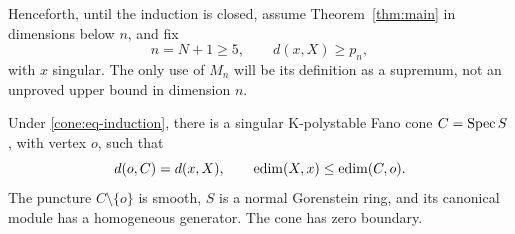 Henceforth, until the induction is closed, assume
Theorem~\ref{thm:main} in dimensions below \(n\), and fix
\begin{equation}\label{cone:eq-induction}
 n=N+1\ge5,\qquad
 d(x,X)\ge p_n,
\end{equation}
with \(x\) singular. The only use of \(M_n\) will be its definition
as a supremum, not an unproved upper bound in dimension \(n\).

\begin{proposition}\label{cone:reduction}
Under \eqref{cone:eq-induction}, there is a singular
K-polystable Fano cone \(C=\operatorname{Spec} S\), with vertex \(o\), such that
\[
 d(o,C)=d(x,X),\qquad
 \operatorname{edim}(X,x)\le\operatorname{edim}(C,o).
\]
The puncture \(C\setminus\{o\}\) is smooth, \(S\) is a normal
Gorenstein ring, and its canonical module has a homogeneous
generator. The cone has zero boundary.
\end{proposition}

